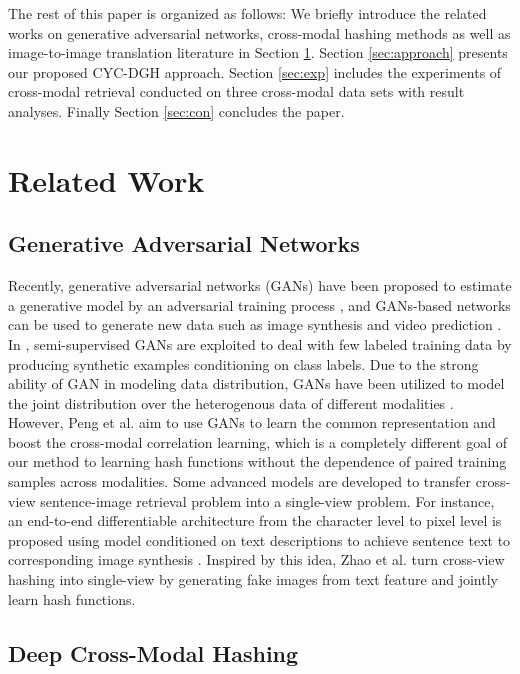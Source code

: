 \documentclass[10pt,journal,twocolumn]{IEEEtran}
\begin{document}
The rest of this paper is organized as follows: We briefly introduce the related works on generative adversarial networks, cross-modal hashing methods as well as image-to-image translation literature in Section \ref{sec:related}. Section \ref{sec:approach} presents our proposed CYC-DGH approach. Section \ref{sec:exp} includes the experiments of cross-modal retrieval conducted on three cross-modal data sets with result analyses. Finally Section \ref{sec:con} concludes the paper.

\section{Related Work}\label{sec:related}

\subsection{Generative Adversarial Networks}
Recently, generative adversarial networks (GANs) have been proposed to estimate a generative model by an adversarial training process \cite{GAN}, and GANs-based networks can be used to generate new data such as image synthesis \cite{DCGANs} and video prediction \cite{Interact-Video}. In \cite{DSH-GANs}, semi-supervised GANs are exploited to deal with few labeled training data by producing synthetic examples conditioning on class labels. Due to the strong ability of GAN in modeling data distribution, GANs have been utilized to model the joint distribution over the heterogenous data of different modalities \cite{CM-GANs}. However, Peng et al. \cite{CM-GANs} aim to use GANs to learn the common representation and boost the cross-modal correlation learning, which is a completely different goal of our method to learning hash functions without the dependence of paired training samples across modalities. Some advanced models are developed to transfer cross-view sentence-image retrieval problem into a single-view problem. For instance, an end-to-end differentiable architecture from the character level to pixel level is proposed using model conditioned on text descriptions to achieve sentence text to corresponding image synthesis \cite{Generate-txt-img}. Inspired by this idea, Zhao et al. \cite{TUCH} turn cross-view hashing into single-view by generating fake images from text feature and jointly learn hash functions.




\subsection{Deep Cross-Modal Hashing}
\end{document}
